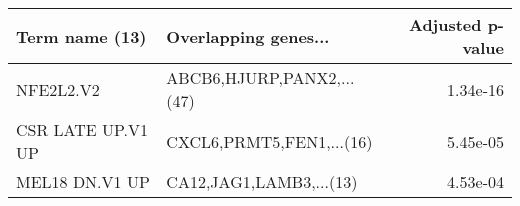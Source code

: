 \begin{tabular}{llr}
\toprule
   Term name (13) &      Overlapping genes... &  Adjusted p-value \\
\midrule
        NFE2L2.V2 & ABCB6,HJURP,PANX2,...(47) &          1.34e-16 \\
CSR LATE UP.V1 UP &  CXCL6,PRMT5,FEN1,...(16) &          5.45e-05 \\
   MEL18 DN.V1 UP &   CA12,JAG1,LAMB3,...(13) &          4.53e-04 \\
\bottomrule
\end{tabular}
